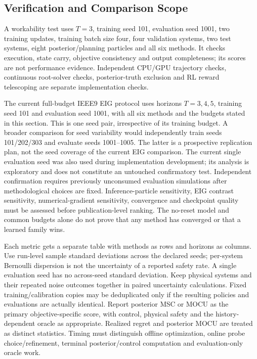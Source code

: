 \documentclass[journal]{IEEEtran}
\begin{document}
\subsection{Verification and Comparison Scope}
A workability test uses $T=3$, training seed 101, evaluation seed 1001,
two training updates, training batch size four, four validation systems, two test systems,
eight posterior/planning particles and all six methods. It checks execution,
state carry, objective consistency and output completeness; its scores are
not performance evidence. Independent CPU/GPU trajectory checks, continuous
root-solver checks, posterior-truth exclusion and RL reward telescoping are
separate implementation checks.

The current full-budget IEEE9 EIG protocol uses horizons $T=3,4,5$, training
seed 101 and evaluation seed 1001, with all six methods and the budgets stated
in this section. This is one seed pair, irrespective of its
training budget. A broader comparison for seed variability would independently
train seeds 101/202/303 and evaluate seeds 1001--1005. The latter is a prospective replication plan, not the seed coverage of the
current EIG comparison. The current single evaluation seed was also used during
implementation development; its analysis is exploratory and does not constitute
an untouched confirmatory test. Independent confirmation requires previously
unconsumed evaluation simulations after methodological choices are fixed.
Inference-particle sensitivity, EIG contrast sensitivity, numerical-gradient
sensitivity, convergence and checkpoint quality must be assessed before
publication-level ranking. The no-reset model and common budgets alone do
not prove that any method has converged or that a learned family wins.

Each metric gets a separate table with methods as rows and horizons as columns.
Use run-level sample standard deviations across the declared seeds;
per-system Bernoulli dispersion is not the uncertainty of a reported safety
rate. A single evaluation seed has no across-seed standard deviation.
Keep physical systems and their repeated noise outcomes together in paired
uncertainty calculations. Fixed training/calibration copies may be deduplicated
only if the resulting policies and evaluations are actually identical.
Report posterior MSC or MOCU as the primary objective-specific score, with
control, physical safety and the history-dependent oracle as appropriate.
Realized regret and posterior MOCU are treated as distinct statistics. Timing must distinguish
offline optimization, online probe choice/refinement, terminal posterior/control
computation and evaluation-only oracle work.
\end{document}

